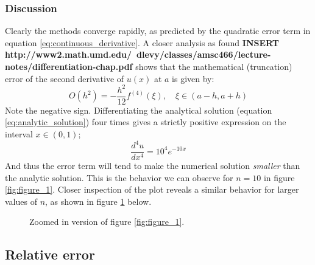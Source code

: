 \documentclass[a4paper, 10pt]{article}
\begin{document}
\subsubsection{Discussion}
Clearly the methods converge rapidly, as predicted by the quadratic error term in equation \ref{eq:continuous_derivative}. A closer analysis as found \textbf{INSERT http://www2.math.umd.edu/~dlevy/classes/amsc466/lecture-notes/differentiation-chap.pdf} shows that the mathematical (truncation) error of the second derivative of $u(x)$ at $a$ is given by:
\begin{equation}
O(h^2)= -\frac{h^2}{12}f^{(4)}(\xi), \quad \xi \in (a-h, a+h)
\end{equation}
Note the negative sign. Differentiating the analytical solution (equation \ref{eq:analytic_solution}) four times gives a strictly positive expression on the interval $x\in (0,1)$;
$$\frac{d^4 u}{dx^4}=10^4 e^{-10x}$$
And thus the error term will tend to make the numerical solution \textit{smaller} than the analytic solution. This is the behavior we can observe for $n=10$ in figure \ref{fig:figure_1}. Closer inspection of the plot reveals a similar behavior for larger values of $n$, as shown in figure \ref{fig:figure_2} below.
\begin{center}
\begin{figure}[h]
\caption{Zoomed in version of figure \ref{fig:figure_1}.} 
\label{fig:figure_2}
\end{figure}
\end{center}
\pagebreak
\subsection{Relative error}
\end{document}
